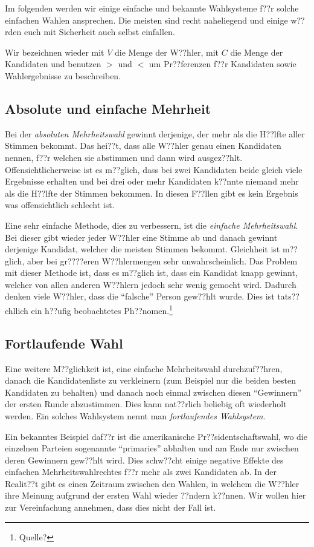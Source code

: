 \documentclass{zirkelblatt1415}
\theoremstyle{definition}
\theoremstyle{definition}
\theoremstyle{definition}
\theoremstyle{definition}
\theoremstyle{remark}
\begin{document}
Im folgenden werden wir einige einfache und bekannte Wahlsysteme f??r solche einfachen Wahlen ansprechen. Die meisten sind recht naheliegend und einige w??rden euch mit Sicherheit auch selbst einfallen.

Wir  bezeichnen wieder mit $V$ die Menge der W??hler, mit $C$ die Menge der Kandidaten und benutzen $>$ und $<$ um Pr??ferenzen f??r Kandidaten sowie Wahlergebnisse zu beschreiben.

\subsection{Absolute und einfache Mehrheit}

Bei der \emph{absoluten Mehrheitswahl} gewinnt derjenige, der mehr als die H??lfte aller Stimmen bekommt. Das hei??t, dass alle W??hler genau einen Kandidaten nennen, f??r welchen sie abstimmen und dann wird ausgez??hlt. Offensichtlicherweise ist es m??glich, dass bei zwei Kandidaten beide gleich viele Ergebnisse erhalten und bei drei oder mehr Kandidaten k??nnte niemand mehr als die H??lfte der Stimmen bekommen. In diesen F??llen gibt es kein Ergebnis was offensichtlich schlecht ist.

Eine sehr einfache Methode, dies zu verbessern, ist die \emph{einfache Mehrheitswahl}. Bei dieser gibt wieder jeder W??hler eine Stimme ab und danach gewinnt derjenige Kandidat, welcher die meisten Stimmen bekommt. Gleichheit ist m??glich, aber bei gr????eren W??hlermengen sehr unwahrscheinlich. Das Problem mit dieser Methode ist, dass es m??glich ist, dass ein Kandidat knapp gewinnt, welcher von allen anderen W??hlern jedoch sehr wenig gemocht wird. Dadurch denken viele W??hler, dass die "`falsche"' Person gew??hlt wurde. Dies ist tats??chllich ein h??ufig beobachtetes Ph??nomen.\footnote{Quelle?}

\subsection{Fortlaufende Wahl}

Eine weitere M??glichkeit ist, eine einfache Mehrheitswahl durchzuf??hren, danach die Kandidatenliste zu verkleinern (zum Beispiel nur die beiden besten Kandidaten zu behalten) und danach noch einmal zwischen diesen "`Gewinnern"' der ersten Runde abzustimmen. Dies kann nat??rlich beliebig oft wiederholt werden. Ein solches Wahlsystem nennt man \emph{fortlaufendes Wahlsystem}.

Ein bekanntes Beispiel daf??r ist die amerikanische Pr??sidentschaftswahl, wo die einzelnen Parteien sogenannte "`primaries"' abhalten und am Ende nur zwischen deren Gewinnern gew??hlt wird. Dies schw??cht einige negative Effekte des einfachen Mehrheitswahlrechtes f??r mehr als zwei Kandidaten ab. In der Realit??t gibt es einen Zeitraum zwischen den Wahlen, in welchem die W??hler ihre Meinung aufgrund der ersten Wahl wieder ??ndern k??nnen. Wir wollen hier zur Vereinfachung annehmen, dass dies nicht der Fall ist.
\end{document}

